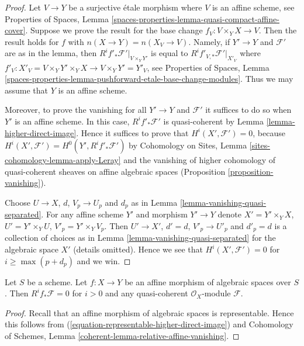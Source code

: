 \begin{proof}
Let $V \to Y$ be a surjective \'etale morphism where $V$ is an affine
scheme, see
Properties of Spaces, Lemma
\ref{spaces-properties-lemma-quasi-compact-affine-cover}.
Suppose we prove the result for the base change $f_V : V \times_Y X \to V$.
Then the result holds for $f$ with $n(X \to Y) = n(X_V \to V)$.
Namely, if $Y' \to Y$ and $\mathcal{F}'$ are as in the lemma, then
$R^if'_*\mathcal{F}'|_{V \times_Y Y'}$ is equal to
$R^if'_{V, *}\mathcal{F}'|_{X'_V}$ where
$f'_V : X'_V = V \times_Y Y' \times_Y X \to V \times_Y Y' = Y'_V$, see
Properties of Spaces,
Lemma \ref{spaces-properties-lemma-pushforward-etale-base-change-modules}.
Thus we may assume that $Y$ is an affine scheme.

\medskip\noindent
Moreover, to prove the vanishing for all $Y' \to Y$ and
$\mathcal{F}'$ it suffices to do so when $Y'$ is an affine scheme.
In this case, $R^if'_*\mathcal{F}'$ is quasi-coherent by
Lemma \ref{lemma-higher-direct-image}.
Hence it suffices to prove that $H^i(X', \mathcal{F}') = 0$, because
$H^i(X', \mathcal{F}') = H^0(Y', R^if'_*\mathcal{F}')$ by
Cohomology on Sites, Lemma \ref{sites-cohomology-lemma-apply-Leray}
and the vanishing of higher cohomology of quasi-coherent sheaves
on affine algebraic spaces
(Proposition \ref{proposition-vanishing}).

\medskip\noindent
Choose $U \to X$, $d$, $V_p \to U_p$ and $d_p$ as in
Lemma \ref{lemma-vanishing-quasi-separated}.
For any affine scheme $Y'$ and morphism $Y' \to Y$ denote
$X' = Y' \times_Y X$, $U' = Y' \times_Y U$, $V'_p = Y' \times_Y V_p$.
Then $U' \to X'$, $d' = d$, $V'_p \to U'_p$ and $d'_p = d$
is a collection of choices as in
Lemma \ref{lemma-vanishing-quasi-separated}
for the algebraic space $X'$ (details omitted).
Hence we see that $H^i(X', \mathcal{F}') = 0$ for $i \geq \max(p + d_p)$
and we win.
\end{proof}

\begin{lemma}
\label{lemma-affine-vanishing-higher-direct-images}
Let $S$ be a scheme. Let $f : X \to Y$ be an affine
morphism of algebraic spaces over $S$. Then
$R^if_*\mathcal{F} = 0$ for $i > 0$ and any quasi-coherent
$\mathcal{O}_X$-module $\mathcal{F}$.
\end{lemma}

\begin{proof}
Recall that an affine morphism of algebraic spaces is representable.
Hence this follows from (\ref{equation-representable-higher-direct-image}) and
Cohomology of Schemes, Lemma \ref{coherent-lemma-relative-affine-vanishing}.
\end{proof}


